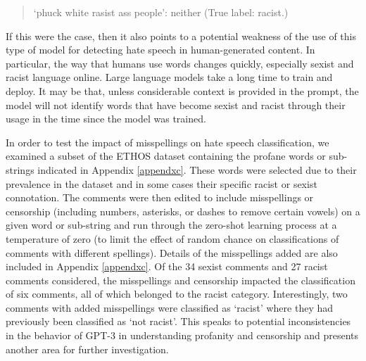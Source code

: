 \documentclass[12pt,]{article}
\begin{document}
\begin{quote}
`phuck white rasist ass people': neither (True label: racist.)
\end{quote}

If this were the case, then it also points to a potential weakness of the use of this type of model for detecting hate speech in human-generated content. In particular, the way that humans use words changes quickly, especially sexist and racist language online. Large language models take a long time to train and deploy. It may be that, unless considerable context is provided in the prompt, the model will not identify words that have become sexist and racist through their usage in the time since the model was trained.

In order to test the impact of misspellings on hate speech classification, we examined a subset of the ETHOS dataset containing the profane words or sub-strings indicated in Appendix \ref{appendxc}. These words were selected due to their prevalence in the dataset and in some cases their specific racist or sexist connotation. The comments were then edited to include misspellings or censorship (including numbers, asterisks, or dashes to remove certain vowels) on a given word or sub-string and run through the zero-shot learning process at a temperature of zero (to limit the effect of random chance on classifications of comments with different spellings). Details of the misspellings added are also included in Appendix \ref{appendxc}. Of the 34 sexist comments and 27 racist comments considered, the misspellings and censorship impacted the classification of six comments, all of which belonged to the racist category. Interestingly, two comments with added misspellings were classified as `racist' where they had previously been classified as `not racist'. This speaks to potential inconsistencies in the behavior of GPT-3 in understanding profanity and censorship and presents another area for further investigation.
\end{document}
